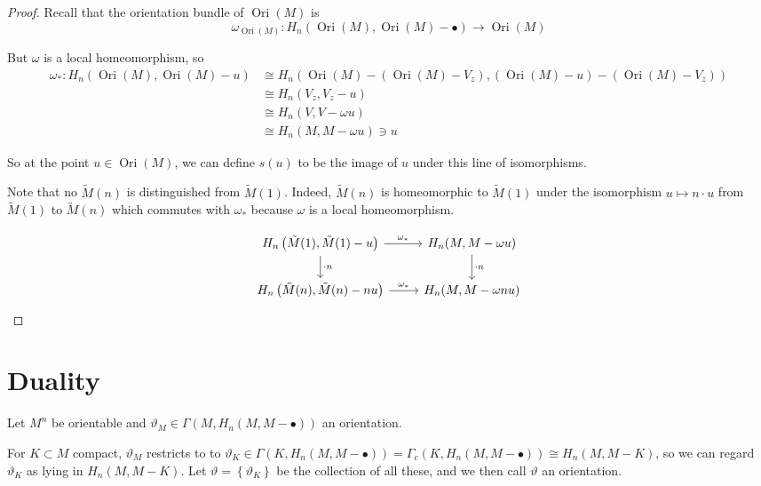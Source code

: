 \documentclass[reqno]{amsart}
\theoremstyle{definition}
\theoremstyle{remark}
\DeclareMathOperator{\Ori}{Ori}
\begin{document}
\begin{proof}
   Recall that the orientation bundle of $\Ori(M)$ is
   \[
   \omega_{\Ori(M)} \colon H_n (\Ori(M), \Ori(M) - \bullet) \to \Ori(M)
   \] 

   But $\omega$ is a local homeomorphism, so
   \begin{align*}
   \omega_* \colon H_n(\Ori(M), \Ori(M) - 
   u) 
   &\cong H_n \left( \Ori(M) - (\Ori(M) - V_z),
   (\Ori(M) - u) - (\Ori(M) - V_z)\right) \\
   &\cong H_n (V_z, V_z - u) \\
   &\cong H_n \left( V, V- \omega u \right) \\
   &\cong H_n \left( M, M - \omega u \right) \ni u
   \end{align*}

   So at the point $u \in \Ori(M)$, we can define
   $s(u)$ to be the image of $u$ under this line of isomorphisms.

   Note that
   no $\tilde{M}(n)$ is distinguished from
   $\tilde{M}(1)$. Indeed, $\tilde{M}(n)$ is homeomorphic
   to $\tilde{M}(1)$ under the isomorphism
   $u \mapsto n \cdot u$ from $\tilde{M}(1)$ to $\tilde{M}(n)$ which
   commutes with $\omega_*$ because $\omega$ is a local
   homeomorphism.

   \begin{equation*}
   \begin{tikzcd}
       H_n \left( \tilde{M}(1), \tilde{M}(1) - u \right) 
       \ar[d, "\cdot n"] \ar[r, "\omega_*"] & H_n (M, M - \omega u) \ar[d,
       "\cdot n"] \\
       H_n \left( \tilde{M}(n), \tilde{M}(n)- nu \right) 
       \ar[r, "\omega_*"] & H_n (M, M - \omega n u)
   \end{tikzcd}
   \end{equation*}

\end{proof}







\section{Duality}

Let $M^{n}$ be orientable and $\vartheta_M \in 
\Gamma \left( M, H_n (M,M - \bullet) \right) $ an orientation.

For $K \subset M$ compact, $\vartheta_M$ restricts to
to
$\vartheta_K \in \Gamma \left( K, H_n (M, M - \bullet) \right)
  = \Gamma_c (K , H_n (M, M - \bullet)) 
    \cong H_n (M, M - K)$, so we can regard
    $\vartheta_K$ as lying in
    $H_n (M, M - K)$. Let
    $\vartheta = \left\{ \vartheta_K \right\} $ be the collection
    of all these, and we then call $\vartheta$ an
orientation.
\end{document}
